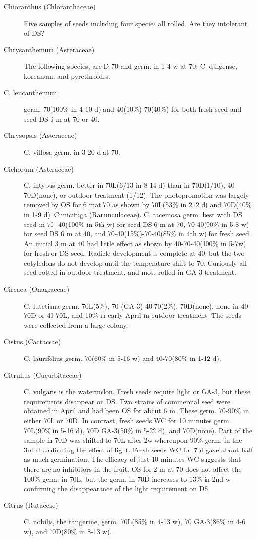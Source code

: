 \begin{description}
\item [Chioranthus (Chloranthaceae)] Five samples of seeds including four
species all rolled. Are they intolerant of DS?
\item [Chrysanthemum (Asteraceae)] The following species, are D-70 and germ.
in 1-4 w at 70: C. djilgense, koreanum, and pyrethroides.
\item [C. leucanthemum] germ. 70(100\% in 4-10 d) and 40(10\%)-70(40\%) for both
fresh seed and seed DS 6 m at 70 or 40.
\item [Chrysopsis (Asteraceae)] C. villosa germ. in 3-20 d at 70.
\item [Cichorum (Asteraceae)] C. intybus germ. better in 70L(6/13 in 8-14 d) than
in 70D(1/10), 40-70D(none), or outdoor treatment (1/12). The photopromotion was
largely removed by OS for 6 mat 70 as shown by 70L(53\% in 212 d) and 70D(40\% in
1-9 d). Cimicifuga (Ranunculaceae). C. racemosa germ. best with DS seed in 70-
40(100\% in 5th w) for seed DS 6 m at 70, 70-40(90\% in 5-8 w) for seed DS 6 m at 40,
and 70-40(15\%)-70-40(85\% in 4th w) for fresh seed. An initial 3 m at 40 had little
effect as shown by 40-70-40(100\% in 5-7w) for fresh or DS seed. Radicle
development is complete at 40, but the two cotyledons do not develop until the
temperature shift to 70. Curiously all seed rotted in outdoor treatment, and most rolled
in GA-3 treatment.
\item [Circaea (Onagraceae)] C. lutetiana germ. 70L(5\%), 70 (GA-3)-40-70(2\%),
70D(none), none in 40-70D or 40-70L, and 10\% in early April in outdoor treatment.
The seeds were collected from a large colony.
\item [Cistus (Cactaceae)] C. laurifolius germ. 70(60\% in 5-16 w) and 40-70(80\%
in 1-12 d).
\item [Citrullus (Cucurbitaceae)] C. vulgaris is the watermelon. Fresh seeds
require light or GA-3, but these requirements disappear on DS. Two strains of
commercial seed were obtained in April and had been OS for about 6 m. These germ.
70-90\% in either 70L or 70D. In contrast, fresh seeds WC for 10 minutes germ.
70L(90\% in 5-16 d), 70D GA-3(50\% in 5-22 d), and 70D(none). Part of the sample in
70D was shifted to 70L after 2w whereupon 90\% germ. in the 3rd d confirming the
effect of light. Fresh seeds WC for 7 d gave about half as much germination. The
efficacy of just 10 minutes WC suggests that there are no inhibitors in the fruit. OS for
2 m at 70 does not affect the 100\% germ. in 70L, but the germ. in 70D increases to
13\% in 2nd w confirming the disappearance of the light requirement on DS.
\item [Citrus (Rutaceae)] C. nobilis, the tangerine, germ. 70L(85\% in 4-13 w), 70
GA-3(86\% in 4-6 w), and 70D(80\% in 8-13 w).


\end{description}
